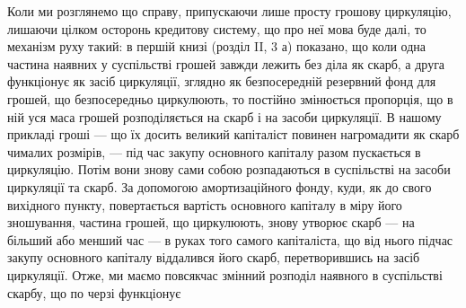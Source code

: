 Коли ми розглянемо що справу, припускаючи лише просту грошову
циркуляцію, лишаючи цілком осторонь кредитову систему, що про неї
мова буде далі, то механізм руху такий: в першій книзі (розділ II, 3 а)
показано, що коли одна частина наявних у суспільстві грошей завжди
лежить без діла як скарб, а друга функціонує як засіб циркуляції, зглядно
як безпосередній резервний фонд для грошей, що безпосередньо циркулюють,
то постійно змінюється пропорція, що в ній уся маса грошей
розподіляється на скарб і на засоби циркуляції. В нашому прикладі
гроші — що їх досить великий капіталіст повинен нагромадити як скарб
чималих розмірів, — під час закупу основного капіталу разом пускається
в циркуляцію. Потім вони знову сами собою розпадаються в суспільстві
на засоби циркуляції та скарб. За допомогою амортизаційного фонду,
куди, як до свого вихідного пункту, повертається вартість основного капіталу
в міру його зношування, частина грошей, що циркулюють, знову
утворює скарб — на більший або менший час — в руках того самого капіталіста,
що від нього підчас закупу основного капіталу віддалився його
скарб, перетворившись на засіб циркуляції. Отже, ми маємо повсякчас
змінний розподіл наявного в суспільстві скарбу, що по черзі функціонує
\parbreak{}  %

